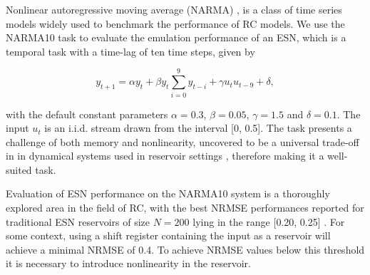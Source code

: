 Nonlinear autoregressive moving average (NARMA) \cite{atiya_new_2000},
\cite{kubota_dynamical_2019} is a class of time series models widely used to
benchmark the performance of RC models. We use the NARMA10 task to evaluate the
emulation performance of an ESN, which is a temporal task with a time-lag of ten
time steps, given by


\begin{equation}
  y_{t+1} = \alpha y_{t} +
  \beta y_{t} \sum_{i=0}^{9}y_{t-i} +
  \gamma u_{t}u_{t-9} +
  \delta,
  \label{narma}
\end{equation}

\noindent with the default constant parameters $\alpha = 0.3$, $\beta = 0.05$,
$\gamma = 1.5$ and $\delta = 0.1$. The input $u_{t}$ is an i.i.d. stream drawn
from the interval [0, 0.5]. The task presents a challenge of both memory and
nonlinearity, uncovered to be a universal trade-off in in dynamical systems used
in reservoir settings \cite{dambre_information_2012, verstraeten_memory_2010},
therefore making it a well-suited task.

Evaluation of ESN performance on the NARMA10 system is a thoroughly explored
area in the field of RC, with the best NRMSE performances reported for
traditional ESN reservoirs of size $N = 200$ lying in the range [0.20, 0.25]
\cite{goudarzi_comparative_2014, rodan_minimum_2011,
verstraeten_experimental_2007, jaeger_adaptive_nodate}. For some context, using
a shift register containing the input as a reservoir will achieve a minimal
NRMSE of 0.4. To achieve NRMSE values below this threshold it is necessary to
introduce nonlinearity in the reservoir.



